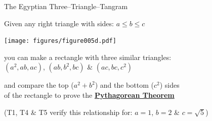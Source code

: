 \documentclass[14pt]{beamer}
\begin{document}

    \begin{frame}{The Egyptian Three--Triangle--Tangram}
        \begin{center}
            Given any right triangle with sides: {\small $a \leq b \leq c$}

            \bigskip\bigskip

            \texttt{[image: figures/figure005d.pdf]}

            \bigskip

            {\small you can make a rectangle with three similar triangles:\\{\footnotesize $(a^{2},ab,ac)$,\; $(ab,b^{2},bc)$\; \&\; $(ac,bc,c^{2})$}\\\bigskip

            and compare the top {\footnotesize($a^{2}\!+\!b^{2}$)} and the bottom {\footnotesize($c^{2}$)} sides\\of the rectangle to prove the \textbf{\href{https://en.wikipedia.org/wiki/Pythagorean_theorem}{Pythagorean Theorem}}}

            \bigskip

            {\footnotesize (T1, T4 \& T5 verify this relationship for: $a=1$,\; $b=2$\; \&\; $c=\sqrt{5}$)}
        \end{center}
    \end{frame}

\end{document}
